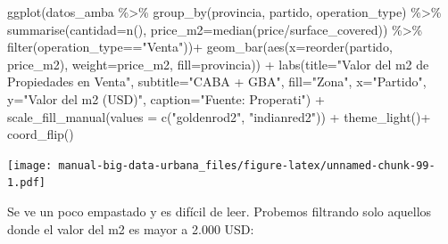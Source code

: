 \documentclass[
  spanish,
]{book}
\newenvironment{Shaded}{\begin{snugshade}}{\end{snugshade}}
\newcommand{\AttributeTok}[1]{\textcolor[rgb]{0.77,0.63,0.00}{#1}}
\newcommand{\FunctionTok}[1]{\textcolor[rgb]{0.00,0.00,0.00}{#1}}
\newcommand{\NormalTok}[1]{#1}
\newcommand{\SpecialCharTok}[1]{\textcolor[rgb]{0.00,0.00,0.00}{#1}}
\newcommand{\StringTok}[1]{\textcolor[rgb]{0.31,0.60,0.02}{#1}}
\begin{document}
\begin{Shaded}
\begin{Highlighting}[]
\FunctionTok{ggplot}\NormalTok{(datos\_amba }\SpecialCharTok{\%\textgreater{}\%}
        \FunctionTok{group\_by}\NormalTok{(provincia, partido, operation\_type) }\SpecialCharTok{\%\textgreater{}\%}
        \FunctionTok{summarise}\NormalTok{(}\AttributeTok{cantidad=}\FunctionTok{n}\NormalTok{(),}
                  \AttributeTok{price\_m2=}\FunctionTok{median}\NormalTok{(price}\SpecialCharTok{/}\NormalTok{surface\_covered)) }\SpecialCharTok{\%\textgreater{}\%}
        \FunctionTok{filter}\NormalTok{(operation\_type}\SpecialCharTok{==}\StringTok{"Venta"}\NormalTok{))}\SpecialCharTok{+}
  \FunctionTok{geom\_bar}\NormalTok{(}\FunctionTok{aes}\NormalTok{(}\AttributeTok{x=}\FunctionTok{reorder}\NormalTok{(partido, price\_m2), }\AttributeTok{weight=}\NormalTok{price\_m2, }\AttributeTok{fill=}\NormalTok{provincia)) }\SpecialCharTok{+}
  \FunctionTok{labs}\NormalTok{(}\AttributeTok{title=}\StringTok{"Valor del m2 de Propiedades en Venta"}\NormalTok{,}
       \AttributeTok{subtitle=}\StringTok{"CABA + GBA"}\NormalTok{,}
       \AttributeTok{fill=}\StringTok{"Zona"}\NormalTok{,}
       \AttributeTok{x=}\StringTok{"Partido"}\NormalTok{,}
       \AttributeTok{y=}\StringTok{"Valor del m2 (USD)"}\NormalTok{,}
       \AttributeTok{caption=}\StringTok{"Fuente: Properati"}\NormalTok{) }\SpecialCharTok{+}
  \FunctionTok{scale\_fill\_manual}\NormalTok{(}\AttributeTok{values =} \FunctionTok{c}\NormalTok{(}\StringTok{"goldenrod2"}\NormalTok{, }\StringTok{"indianred2"}\NormalTok{)) }\SpecialCharTok{+}
  \FunctionTok{theme\_light}\NormalTok{()}\SpecialCharTok{+}
  \FunctionTok{coord\_flip}\NormalTok{()}
\end{Highlighting}
\end{Shaded}

\texttt{[image: manual-big-data-urbana\_files/figure-latex/unnamed-chunk-99-1.pdf]}

Se ve un poco empastado y es difícil de leer. Probemos filtrando solo aquellos donde el valor del m2 es mayor a 2.000 USD:
\end{document}
